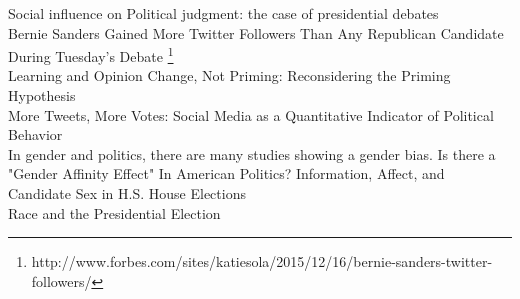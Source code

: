 \documentclass[letterpaper]{article}
\begin{document}








\iffalse
Social influence on Political judgment: the case of presidential debates\\
Bernie Sanders Gained More Twitter Followers Than Any Republican Candidate During Tuesday's Debate \footnote{http://www.forbes.com/sites/katiesola/2015/12/16/bernie-sanders-twitter-followers/}\\
Learning and Opinion Change, Not Priming: Reconsidering the Priming Hypothesis\\
More Tweets, More Votes: Social Media as a Quantitative Indicator of Political Behavior\\
In gender and politics, there are many studies showing a gender bias.
Is there a "Gender Affinity Effect" In American Politics? Information, Affect, and Candidate Sex in H.S. House Elections\\
Race and the Presidential Election\\
\end{document}
